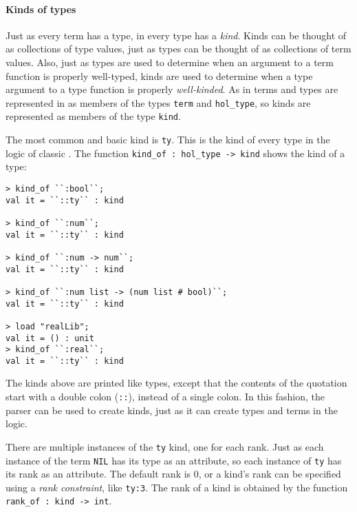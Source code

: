 \paragraph{Kinds of types}

Just as every term has a type, in \HOLW{} every type has a {\it kind}.
Kinds can be thought of as collections of type values, just as types
can be thought of as collections of term values.  Also, just as types
are used to determine when an argument to a term function is properly
well-typed, kinds are used to determine when a  type argument to a type
function is properly {\it well-kinded}.  As in \HOLW{} terms and
types are represented in \ML{} as members of the \ML{} types \texttt{term}
and \texttt{hol\_type},
so kinds are represented as members of the \ML{} type \texttt{kind}.

The most
common and
basic kind is \texttt{ty}.  This is the kind of every type in the
logic of classic \HOL.
The \ML{} function \texttt{kind\_of~:~hol\_type -> kind}
shows the kind of a type:
%
\begin{session}
\begin{verbatim}
> kind_of ``:bool``;
val it = ``::ty`` : kind

> kind_of ``:num``;
val it = ``::ty`` : kind

> kind_of ``:num -> num``;
val it = ``::ty`` : kind

> kind_of ``:num list -> (num list # bool)``;
val it = ``::ty`` : kind

> load "realLib";
val it = () : unit
> kind_of ``:real``;
val it = ``::ty`` : kind
\end{verbatim}
\end{session}

The kinds above are printed like types, except that the contents of the
quotation start with a double colon (\texttt{{:}{:}}),
instead of a single colon.
In this fashion,
the parser can be used to create kinds, just as it can
create types and terms in the \HOLW{} logic.

There are multiple instances of the \texttt{ty} kind, one for each rank.
Just as each instance of
the term \texttt{NIL} has its type as an attribute,
so each instance of \texttt{ty} has its rank as an attribute.
The default rank is 0, or
a kind's rank can be specified using a {\it rank constraint},
like \texttt{ty:3}.
The rank of a kind is obtained by the \ML{} function
\texttt{rank\_of~:~kind -> int}.

